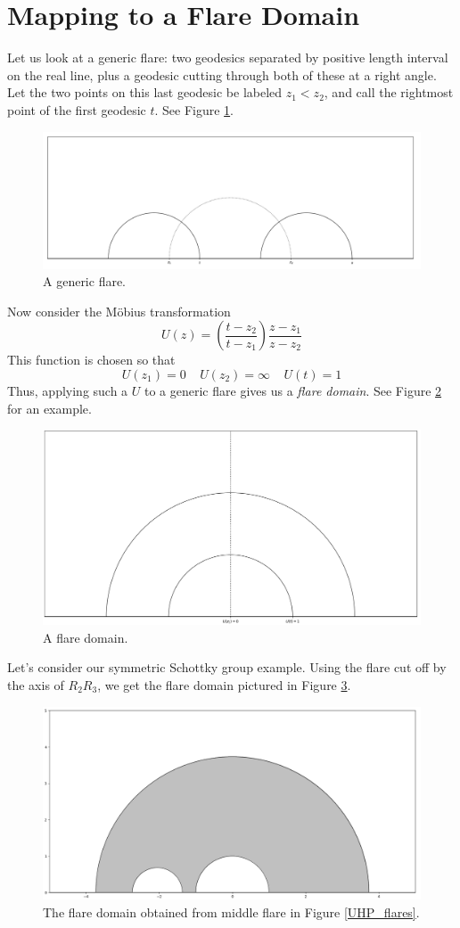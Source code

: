\documentclass[]{article}
\begin{document}
\clearpage

\section*{Mapping to a Flare Domain}

Let us look at a generic flare: two geodesics separated by positive length interval on the real line, plus a geodesic cutting through both of these at a right angle.
Let the two points on this last geodesic be labeled $z_1 < z_2$, and call the rightmost point of the first geodesic $t$.
See Figure \ref{pre_flare}.
\begin{figure}[h]
	\centering
	\includegraphics[width=0.6\linewidth]{labeled_pre_flare.png}
	\caption{A generic flare.}
	\label{pre_flare}
\end{figure}
Now consider the M\"obius transformation
$$
U(z) = \left( \frac{t - z_2}{t - z_1} \right) \frac{z - z_1}{z - z_2}
$$
This function is chosen so that
$$
U(z_1) = 0 ~~~~~ U(z_2) = \infty ~~~~~ U(t) = 1
$$
Thus, applying such a $U$ to a generic flare gives us a \textit{flare domain}.
See Figure \ref{post_flare} for an example.
\begin{figure}[h]
	\centering
	\includegraphics[width=0.6\linewidth]{labeled_flare.png}
	\caption{A flare domain.}
	\label{post_flare}
\end{figure}

Let's consider our symmetric Schottky group example.
Using the flare cut off by the axis of $R_2R_3$, we get the flare domain pictured in Figure \ref{flare}.
\begin{figure}[h]
	\centering
	\includegraphics[width=0.6\linewidth]{flare.png}
	\caption{The flare domain obtained from middle flare in Figure \ref{UHP_flares}.}
	\label{flare}
\end{figure}
\end{document}
